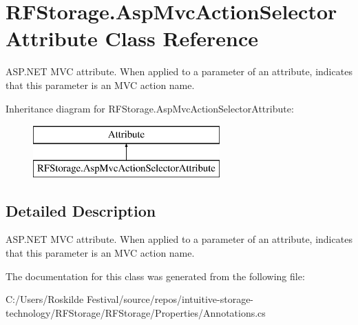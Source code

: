 \hypertarget{class_r_f_storage_1_1_asp_mvc_action_selector_attribute}{}\section{R\+F\+Storage.\+Asp\+Mvc\+Action\+Selector\+Attribute Class Reference}
\label{class_r_f_storage_1_1_asp_mvc_action_selector_attribute}


A\+S\+P.\+N\+ET M\+VC attribute. When applied to a parameter of an attribute, indicates that this parameter is an M\+VC action name.  


Inheritance diagram for R\+F\+Storage.\+Asp\+Mvc\+Action\+Selector\+Attribute\+:\begin{figure}[H]
\begin{center}
\leavevmode
\includegraphics[height=2.000000cm]{class_r_f_storage_1_1_asp_mvc_action_selector_attribute}
\end{center}
\end{figure}


\subsection{Detailed Description}
A\+S\+P.\+N\+ET M\+VC attribute. When applied to a parameter of an attribute, indicates that this parameter is an M\+VC action name. 


\begin{DoxyCode}{0}
\DoxyCodeLine{\}}
\end{DoxyCode}


The documentation for this class was generated from the following file\+:\begin{DoxyCompactItemize}
\item 
C\+:/\+Users/\+Roskilde Festival/source/repos/intuitive-\/storage-\/technology/\+R\+F\+Storage/\+R\+F\+Storage/\+Properties/Annotations.\+cs\end{DoxyCompactItemize}
